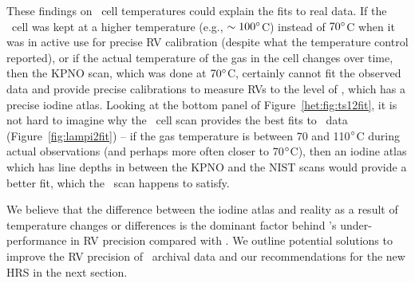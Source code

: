 These findings on \het\ cell temperatures could explain the fits to
real data. If the \het\ cell was kept at a higher temperature (e.g.,
$\sim 100^{\circ}$C) instead of $70^{\circ}$C when it was in active use
for precise RV calibration (despite what the temperature control
reported), or if the actual temperature of the gas in the cell changes
over time, then the KPNO scan, which was done at $70^{\circ}$C,
certainly cannot fit the observed data and provide precise
calibrations to measure RVs to the level of \keck, which has a precise
iodine atlas. Looking at the bottom panel of
Figure~\ref{het:fig:ts12fit}, it is not hard to imagine why the \keck\
cell scan provides the best fits to \het\ data
(Figure~\ref{fig:lampi2fit}) -- if the gas temperature is between 70
and 110$^{\circ}$C during actual observations (and perhaps more often
closer to 70$^{\circ}$C), then an iodine atlas which has line depths in
between the KPNO and the NIST scans would provide a better fit, which
the \keck\ scan happens to satisfy.

We believe that the difference between the iodine atlas and reality as
a result of temperature changes or differences is the dominant factor
behind \het's under-performance in RV precision compared with
\keck. We outline potential solutions to improve the RV precision of
\het\ archival data and our recommendations for the new HRS in the
next section.